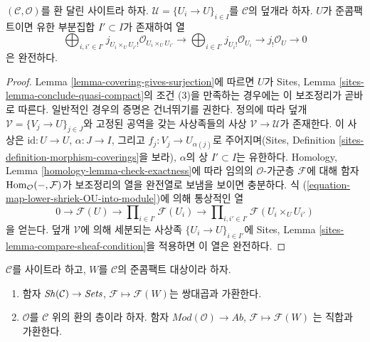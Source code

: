\begin{lemma}
\label{lemma-silly-quasi-compact}
$(\mathcal{C}, \mathcal{O})$를 환 달린 사이트라 하자.
$\mathcal{U} = \{U_i \to U\}_{i \in I}$를 $\mathcal{C}$의 덮개라 하자.
$U$가 준콤팩트이면 유한 부분집합 $I' \subset I$가 존재하여 열
$$
\bigoplus\nolimits_{i, i' \in I'}
j_{U_i \times_U U_{i'}!}\mathcal{O}_{U_i \times_U U_{i'}} \to
\bigoplus\nolimits_{i \in I'}
j_{U_i!}\mathcal{O}_{U_i} \to
j_!\mathcal{O}_U \to 0
$$
은 완전하다.
\end{lemma}

\begin{proof}
Lemma \ref{lemma-covering-gives-surjection}에 따르면 $U$가 Sites, Lemma
\ref{sites-lemma-conclude-quasi-compact}의 조건 (3)을 만족하는 경우에는 이
보조정리가 곧바로 따른다. 일반적인 경우의 증명은 건너뛰기를 권한다.
정의에 따라 덮개 $\mathcal{V} = \{V_j \to U\}_{j \in J}$와 고정된 공역을
갖는 사상족들의 사상 $\mathcal{V} \to \mathcal{U}$가 존재한다. 이 사상은
$\text{id} : U \to U$, $\alpha : J \to I$, 그리고
$f_j : V_j \to U_{\alpha(j)}$로 주어지며(Sites, Definition
\ref{sites-definition-morphism-coverings}을 보라), $\alpha$의 상
$I' \subset I$는 유한하다. Homology, Lemma
\ref{homology-lemma-check-exactness}에 따라 임의의 $\mathcal{O}$-가군층
$\mathcal{F}$에 대해 함자 $\mathop{\mathrm{Hom}}\nolimits_\mathcal{O}(-, \mathcal{F})$가 보조정리의
열을 완전열로 보냄을 보이면 충분하다. 식
(\ref{equation-map-lower-shriek-OU-into-module})에 의해 통상적인 열
$$
0 \to
\mathcal{F}(U) \to
\prod\nolimits_{i \in I'} \mathcal{F}(U_i) \to
\prod\nolimits_{i, i' \in I'} \mathcal{F}(U_i \times_U U_{i'})
$$
을 얻는다. 덮개 $\mathcal{V}$에 의해 세분되는 사상족
$\{U_i \to U\}_{i \in I'}$에 Sites, Lemma
\ref{sites-lemma-compare-sheaf-condition}을 적용하면 이 열은 완전하다.
\end{proof}

\begin{lemma}
\label{lemma-sections-over-quasi-compact}
$\mathcal{C}$를 사이트라 하고, $W$를 $\mathcal{C}$의 준콤팩트 대상이라 하자.
\begin{enumerate}
\item 함자 $\mathop{\mathit{Sh}}\nolimits(\mathcal{C}) \to \textit{Sets}$,
$\mathcal{F} \mapsto \mathcal{F}(W)$는 쌍대곱과 가환한다.
\item $\mathcal{O}$를 $\mathcal{C}$ 위의 환의 층이라 하자. 함자
$\textit{Mod}(\mathcal{O}) \to \textit{Ab}$,
$\mathcal{F} \mapsto \mathcal{F}(W)$
는 직합과 가환한다.
\end{enumerate}
\end{lemma}

